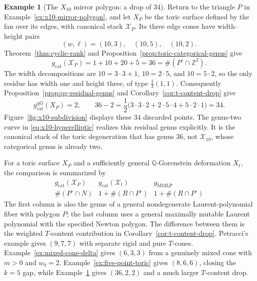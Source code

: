 \documentclass[11pt]{article}
\theoremstyle{plain}
\theoremstyle{definition}
\newtheorem{example}[theorem]{Example}
\theoremstyle{remark}
\newcommand{\cX}{\mathcal X}
\newcommand{\Q}{\mathbb Q}
\newcommand{\Z}{\mathbb Z}
\newcommand{\1}{\mathbf 1}
\begin{document}
\begin{example}[The $X_{10}$ mirror polygon: a drop of $34$]\label{ex:x10-toric-drop}
Return to the triangle $P$ in Example~\ref{ex:x10-mirror-polygon}, and let $X_P$ be the toric surface defined by the fan over its edges, with canonical stack $\mathcal X_P$.  Its three edge cones have width--height pairs
\[
(w,\ell)=(10,3),\quad(10,5),\quad(10,2).
\]
Theorem~\ref{thm:cyclic-rank} and Proposition~\ref{prop:toric-categorical-genus} give
\[
g_{\mathrm{cat}}(\mathcal X_P)=1+10+20+5=36=\#(P^\circ\cap\Z^2).
\]
The width decompositions are $10=3\cdot3+1$, $10=2\cdot5$, and $10=5\cdot2$, so the only residue has width one and height three, of type $\frac13(1,1)$.  Consequently Proposition~\ref{prop:qg-residual-genus} and Corollary~\ref{cor:t-content-drop} give
\[
g_{\mathrm{cat}}^{\mathrm{qG}}(X_P)=2,\qquad
36-2=\frac12\bigl(3\cdot3\cdot2+2\cdot5\cdot4+5\cdot2\cdot1\bigr)=34.
\]
Figure~\ref{fig:x10-subdivision} displays these $34$ discarded points.  The genus-two curve in \eqref{eq:x10-hyperelliptic} realizes this residual genus explicitly.  It is the canonical stack of the toric degeneration that has genus $36$, not $\cX_{10}$, whose categorical genus is already two.
\end{example}

For a toric surface $X_P$ and a sufficiently general $\Q$-Gorenstein deformation $X_t$, the comparison is summarized by
\[
\begin{array}{c|c|c}
g_{\mathrm{cat}}(\mathcal X_P)&g_{\mathrm{cat}}(\mathcal X_t)&g_{\mathrm{MMLP}}\\\hline
\#(P^\circ\cap N)&1+\#(R\cap P^\circ)&1+\#(R\cap P^\circ)
\end{array}
\]
The first column is also the genus of a general nondegenerate Laurent-polynomial fiber with polygon $P$; the last column uses a general maximally mutable Laurent polynomial with the specified Newton polygon.  The difference between them is the weighted $T$-content contribution in Corollary~\ref{cor:t-content-drop}.  Petracci's example gives $(9,7,7)$ with separate rigid and pure $T$-cones.  Example~\ref{ex:mixed-cone-delta} gives $(6,3,3)$ from a genuinely mixed cone with $m>0$ and $w_0=2$.  Example~\ref{ex:five-point-toric} gives $(8,6,6)$, closing the $k=5$ gap, while Example~\ref{ex:x10-toric-drop} gives $(36,2,2)$ and a much larger $T$-content drop.
\end{document}
